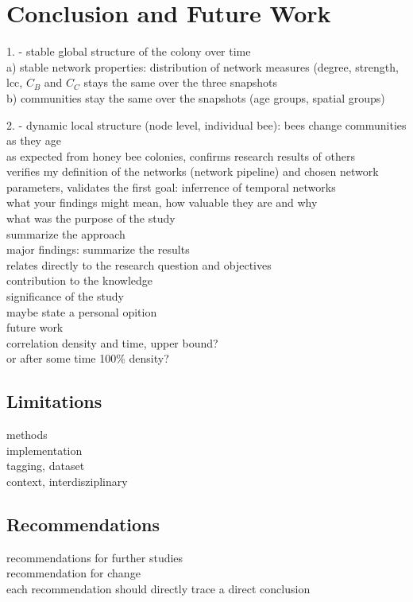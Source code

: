 \chapter{Conclusion and Future Work}
\label{ch:conclusion}
1. - stable global structure of the colony over time\\
a) stable network properties: distribution of network measures (degree, strength, lcc, $C_B$ and $C_C$ stays the same over the three snapshots\\
b) communities stay the same over the snapshots (age groups, spatial groups)

2. - dynamic local structure (node level, individual bee): bees change communities as they age\\

as expected from honey bee colonies, confirms research results of others\\
verifies my definition of the networks (network pipeline) and chosen network parameters, validates the first goal: inferrence of temporal networks\\

what your findings might mean, how valuable they are and why\\
what was the purpose of the study\\
summarize the approach\\
major findings: summarize the results\\


relates directly to the research question and objectives\\
contribution to the knowledge\\
significance of the study\\
maybe state a personal opition\\

future work\\
correlation density and time, upper bound?\\
or after some time 100\% density?\\

\section{Limitations}
methods\\
implementation\\
tagging, dataset\\
context, interdisziplinary\\

\section{Recommendations}
recommendations for further studies\\
recommendation for change\\
each recommendation should directly trace a direct conclusion\\